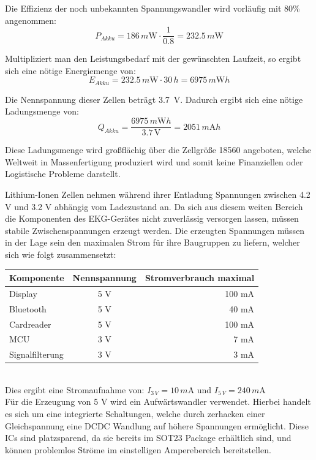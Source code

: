 Die Effizienz der noch unbekannten Spannungswandler wird vorläufig mit 80\% angenommen:
$$ P_{Akku} = 186\,m\mbox{W} \cdot \frac{1}{0.8} = 232.5\,m\mbox{W} $$

Multipliziert man den Leistungsbedarf mit der gewünschten Laufzeit, so ergibt sich eine nötige Energiemenge von:
$$ E_{Akku} = 232.5\,m\mbox{W} \cdot 30\,h = 6975\,m\mbox{W}h $$

Die Nennspannung dieser Zellen beträgt \SI{3,7}{\volt}. Dadurch ergibt sich eine nötige Ladungsmenge von: 
$$ Q_{Akku} = \frac{6975\,m \mbox{W} h}{3.7\,\mbox{V}} = 2051\,m\mbox{A}h $$

Diese Ladungsmenge wird großflächig über die Zellgröße 18560 angeboten, welche Weltweit in Massenfertigung produziert wird und somit keine Finanziellen oder Logistische Probleme darstellt.

Lithium-Ionen Zellen nehmen während ihrer Entladung Spannungen zwischen 4.2 V und 3.2 V abhängig vom Ladezustand an. Da sich aus diesem weiten Bereich die Komponenten des EKG-Gerätes nicht zuverlässig versorgen lassen, müssen stabile Zwischenspannungen erzeugt werden. Die erzeugten Spannungen müssen in der Lage sein den maximalen Strom für ihre Baugruppen zu liefern, welcher sich wie folgt zusammensetzt:\\

\begin{tabular}[h]{l|c|r}
Komponente & Nennspannung & Stromverbrauch maximal\\
\hline
Display & 5 V & 100 mA \\
Bluetooth & 5 V & 40 mA \\
Cardreader & 5 V & 100 mA \\
MCU & 3 V & 7 mA \\
Signalfilterung & 3  V & 3 mA \\
\end{tabular}\\

Dies ergibt eine Stromaufnahme von: $ I_{3\,V} = 10\,m\mbox{A}$ und $I_{5\,V} = 240\,m\mbox{A} $ \\

Für die Erzeugung von 5 V wird ein Aufwärtswandler verwendet. Hierbei handelt es sich um eine integrierte Schaltungen, welche durch zerhacken einer Gleichspannung eine DCDC Wandlung auf höhere Spannungen ermöglicht. Diese ICs sind platzsparend, da sie bereits im SOT23 Package erhältlich sind, und können problemlos Ströme im einstelligen Amperebereich bereitstellen. \\

